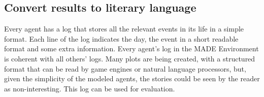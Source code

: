 \documentclass{sig-alternate}
\begin{document}
\subsection{Convert results to literary language}

Every agent has a log that stores all the relevant events in its life
in a simple format. Each line of the log indicates the day, the event
in a short readable format and some extra information. Every agent's
log in the MADE Environment is coherent with all others' logs. Many
plots are being created, with a structured format that can be read by
game engines or natural language processors, but, given the simplicity
of the modeled agents, the stories could be seen by the reader as
non-interesting. This log can be used for evaluation. %












\end{document}
